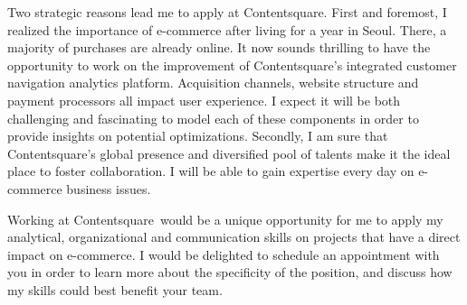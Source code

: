 \documentclass[11pt, a4paper]{awesome-cv}
\newcommand{\company}{Contentsquare}
\begin{document}
\begin{cvletter}
Two strategic reasons lead me to apply at \company.    
First and foremost, I realized the importance of e-commerce after living for a year in Seoul. There, a majority of purchases are already online. It now sounds thrilling to have the opportunity to work on the improvement of \company's integrated customer navigation analytics platform. 
Acquisition channels, website structure and payment processors all impact user experience. I expect it will be both challenging and fascinating to model each of these components in order to provide insights on potential optimizations.
Secondly, I am sure that \company's global presence and diversified pool of talents make it the ideal place to foster collaboration. I will be able to gain expertise every day on e-commerce business issues. 

Working at \company~would be a unique opportunity for me to apply my analytical, organizational and communication skills on projects that have a direct impact on e-commerce. 
I would be delighted to schedule an appointment with you in order to learn more about the specificity of the position, and discuss how my skills could best benefit your team. 
\end{cvletter}


\makeletterclosing
\end{document}
